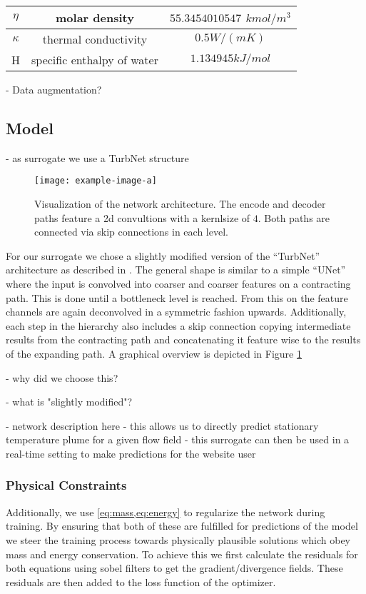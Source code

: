 \documentclass{article} %
\begin{document}
\begin{tabular}{| c | c | c |}
   \hline
   $\eta$   & molar density        & $55.3454010547$ $kmol/m^3$ \\
   \hline
   $\kappa$ & thermal conductivity & $0.5 W/(mK)$                   \\
   \hline
   H        & specific enthalpy of water             & $1.134945 kJ/mol$                  \\
   \hline
\end{tabular}

- Data augmentation? 



\subsection*{Model}
- as surrogate we use a TurbNet structure
\begin{figure}[htb]
   \centering
   \texttt{[image: example-image-a]}
   \caption{Visualization of the network architecture. The encode and decoder paths feature a 2d convultions with a kernlsize of $4$. Both paths are connected via skip connections in each level.}
   \label{fig:arch}
\end{figure}

For our surrogate we chose a slightly modified version of the ``TurbNet'' architecture as described in \cite{turbnet}.
The general shape is similar to a simple ``UNet'' \cite{unet} where the input is convolved into coarser and coarser features on a contracting path.
This is done until a bottleneck level is reached.
From this on the feature channels are again deconvolved in a symmetric fashion upwards.
Additionally, each step in the hierarchy also includes a skip connection copying intermediate results from the contracting path and concatenating it feature wise to the results of the expanding path.
A graphical overview is depicted in Figure \ref{fig:arch}

- why did we choose this?

- what is "slightly modified"?

- network description here
- this allows us to directly predict stationary temperature plume for a given flow field
- this surrogate can then be used in a real-time setting to make predictions for the website user


\subsubsection*{Physical Constraints}
Additionally, we use \cref{eq:mass,eq:energy} to regularize the network during training.
By ensuring that both of these are fulfilled for predictions of the model we steer the training process towards physically plausible solutions which obey mass and energy conservation.
To achieve this we first calculate the residuals for both equations using sobel filters to get the gradient/divergence fields.
These residuals are then added to the loss function of the optimizer.
\end{document}
